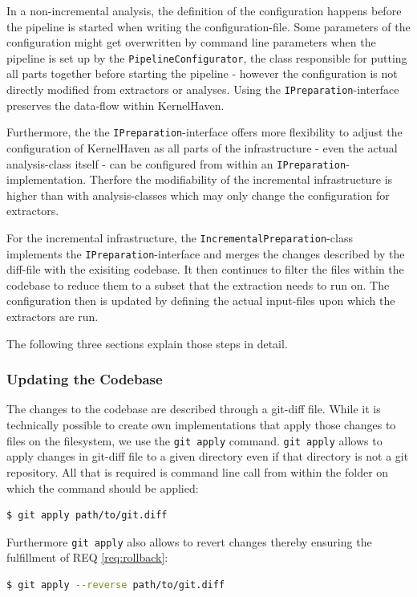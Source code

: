 \documentclass[a4paper]{article}
\begin{document}
In a non-incremental analysis, the definition of the configuration happens before the pipeline is started when writing the configuration-file. Some parameters of the configuration might get overwritten by command line parameters when the pipeline is set up by the \texttt{PipelineConfigurator}, the class responsible for putting all parts together before starting the pipeline - however the configuration is not directly modified from extractors or analyses. Using the \texttt{IPreparation}-interface preserves the data-flow within KernelHaven.

Furthermore, the the \texttt{IPreparation}-interface offers more flexibility to adjust the configuration of KernelHaven as all parts of the infrastructure - even the actual analysis-class itself - can be configured from within an \texttt{IPreparation}-implementation. Therfore the modifiability of the incremental infrastructure is higher than with analysis-classes which may only change the configuration for extractors.

For the incremental infrastructure, the \texttt{IncrementalPreparation}-class implements the \texttt{IPreparation}-interface and merges the changes described by the diff-file with the exisiting codebase. It then continues to filter the files within the codebase to reduce them to a subset that the extraction needs to run on. The configuration then is updated by defining the actual input-files upon which the extractors are run.

The following three sections explain those steps in detail.

\subsubsection{Updating the Codebase}\label{git-apply}

The changes to the codebase are described through a git-diff file. While it is technically possible to create own implementations that apply those changes to files on the filesystem, we use the \texttt{git apply} command. \texttt{git apply} allows to apply changes in git-diff file to a given directory even if that directory is not a git repository. All that is required is command line call from within the folder on which the command should be applied:

\begin{lstlisting}[language=bash]
  $ git apply path/to/git.diff
\end{lstlisting}

 Furthermore \texttt{git apply} also allows to revert changes thereby ensuring the fulfillment of REQ \ref{req:rollback}:
 \begin{lstlisting}[language=bash]
  $ git apply --reverse path/to/git.diff
\end{lstlisting}
 
\end{document}
